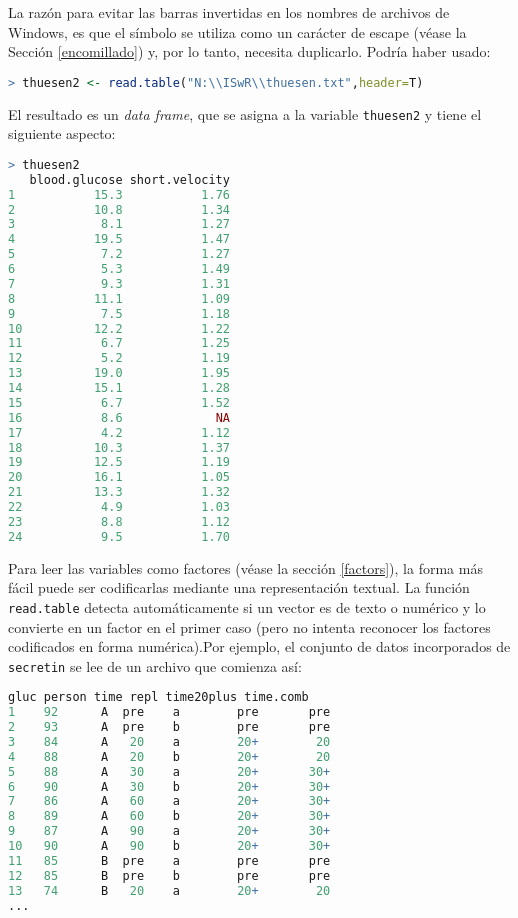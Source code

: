 La razón para evitar las barras invertidas en los nombres de archivos de
Windows, es que el símbolo se utiliza como un carácter de escape (véase la
Sección \ref{encomillado}) y, por lo tanto, necesita duplicarlo. Podría haber
usado:

\begin{lstlisting}[language=R]
> thuesen2 <- read.table("N:\\ISwR\\thuesen.txt",header=T)
\end{lstlisting}

El resultado es un \textit{data frame}, que se asigna a la variable
\texttt{thuesen2} y tiene el siguiente aspecto:

\begin{lstlisting}[language=R]
> thuesen2
   blood.glucose short.velocity
1           15.3           1.76
2           10.8           1.34
3            8.1           1.27
4           19.5           1.47
5            7.2           1.27
6            5.3           1.49
7            9.3           1.31
8           11.1           1.09
9            7.5           1.18
10          12.2           1.22
11           6.7           1.25
12           5.2           1.19
13          19.0           1.95
14          15.1           1.28
15           6.7           1.52
16           8.6             NA
17           4.2           1.12
18          10.3           1.37
19          12.5           1.19
20          16.1           1.05
21          13.3           1.32
22           4.9           1.03
23           8.8           1.12
24           9.5           1.70
\end{lstlisting}

Para leer las variables como factores (véase la sección \ref{factors}), la forma más
fácil puede ser codificarlas mediante una representación textual. La función
\texttt{read.table} detecta automáticamente si un vector es de texto o numérico y lo
convierte en un factor en el primer caso (pero no intenta reconocer los factores
codificados en forma numérica).Por ejemplo, el conjunto de datos incorporados de
\texttt{secretin} se lee de un archivo que comienza así:

\begin{lstlisting}[language=R]
   gluc person time repl time20plus time.comb
1    92      A  pre    a        pre       pre
2    93      A  pre    b        pre       pre
3    84      A   20    a        20+        20
4    88      A   20    b        20+        20
5    88      A   30    a        20+       30+
6    90      A   30    b        20+       30+
7    86      A   60    a        20+       30+
8    89      A   60    b        20+       30+
9    87      A   90    a        20+       30+
10   90      A   90    b        20+       30+
11   85      B  pre    a        pre       pre
12   85      B  pre    b        pre       pre
13   74      B   20    a        20+        20
...
\end{lstlisting}

